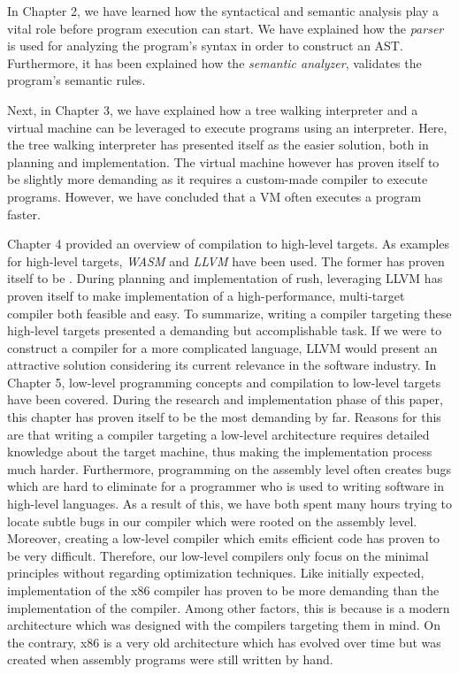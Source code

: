 In Chapter 2, we have learned how the syntactical and semantic analysis play a vital role before program execution can start.
We have explained how the \emph{parser} is used for analyzing the program's syntax in order to construct an AST.
Furthermore, it has been explained how the \emph{semantic analyzer}, validates the program's semantic rules.

Next, in Chapter 3, we have explained how a tree walking interpreter and a virtual machine can be leveraged to execute programs using an interpreter.
Here, the tree walking interpreter has presented itself as the easier solution, both in planning and implementation.
The virtual machine however has proven itself to be slightly more demanding as it requires a custom-made compiler to execute programs.
However, we have concluded that a VM often executes a program faster.

Chapter 4 provided an overview of compilation to high-level targets.
As examples for high-level targets, \emph{WASM} and \emph{LLVM} have been used.
The former has proven itself to be .
During planning and implementation of rush, leveraging LLVM has proven itself to make implementation of a high-performance, multi-target compiler both feasible and easy.
To summarize, writing a compiler targeting these high-level targets presented a demanding but accomplishable task.
If we were to construct a compiler for a more complicated language, LLVM would present an attractive solution considering its current relevance in the software industry.
In Chapter 5, low-level programming concepts and compilation to low-level targets have been covered.
During the research and implementation phase of this paper,
this chapter has proven itself to be the most demanding by far.
Reasons for this are that writing a compiler targeting a low-level architecture
requires detailed knowledge about the target machine, thus making the implementation process much harder.
Furthermore, programming on the assembly level often creates bugs which are hard to eliminate for a programmer who is used to writing software in high-level languages.
As a result of this, we have both spent many hours trying to locate subtle bugs in our compiler which were rooted on the assembly level.
Moreover, creating a low-level compiler which emits efficient code has proven to be very difficult.
Therefore, our low-level compilers only focus on the minimal principles without regarding optimization techniques.
Like initially expected, implementation of the x86 compiler has proven to be more demanding than the implementation of the \riscv{} compiler.
Among other factors, this is because \riscv{} is a modern architecture which was designed with the compilers targeting them in mind.
On the contrary, x86 is a very old architecture which has evolved over time but was created when assembly programs were still written by hand.

